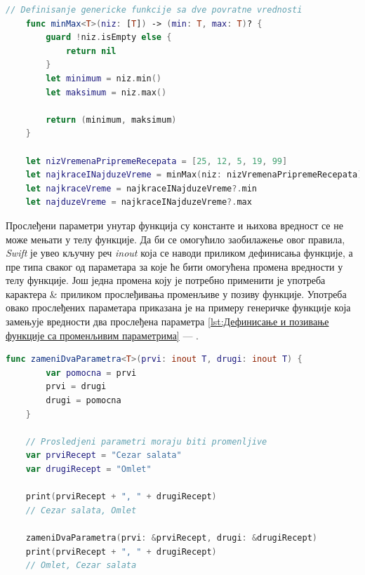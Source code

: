 \documentclass[12pt,oneside]{memoir}
\begin{document}
\begin{lstlisting}[caption=\textit{{Дефинисање и позивање генеричке функције са више повратних вредности}}, label={lst:Дефинисање и позивање генеричке  функције са више повратних вредности}, language=Swift, frame=single]
    // Definisanje genericke funkcije sa dve povratne vrednosti
    func minMax<T>(niz: [T]) -> (min: T, max: T)? {
        guard !niz.isEmpty else {
            return nil
        }
        let minimum = niz.min()
        let maksimum = niz.max()
        
        return (minimum, maksimum)
    }
    
    let nizVremenaPripremeRecepata = [25, 12, 5, 19, 99]
    let najkraceINajduzeVreme = minMax(niz: nizVremenaPripremeRecepata)
    let najkraceVreme = najkraceINajduzeVreme?.min
    let najduzeVreme = najkraceINajduzeVreme?.max
\end{lstlisting}

\indent Прослеђени параметри унутар функција су константе и њихова вредност се не може мењати у телу функције. Да би се омогућило заобилажење овог правила, \textit{Swift} је увео кључну реч \textit{inout} која се наводи приликом дефинисања функције, а пре типа сваког од параметара за које ће бити омогућена промена вредности у телу функције. Још једна промена коју је потребно применити је употреба карактера \& приликом прослеђивања променљиве у позиву функције. Употреба овако прослеђених параметара приказана је на примеру генеричке функције која замењује вредности два прослеђена параметра \ref{lst:Дефинисање и позивање функције са променљивим параметрима} --- . 

\begin{lstlisting}[caption=\textit{{Дефинисање и позивање функције са променљивим параметрима}}, label={lst:Дефинисање и позивање функције са променљивим параметрима}, language=Swift, frame=single]
    func zameniDvaParametra<T>(prvi: inout T, drugi: inout T) {
        var pomocna = prvi
        prvi = drugi
        drugi = pomocna
    }
    
    // Prosledjeni parametri moraju biti promenljive
    var prviRecept = "Cezar salata"
    var drugiRecept = "Omlet"
    
    print(prviRecept + ", " + drugiRecept)
    // Cezar salata, Omlet
    
    zameniDvaParametra(prvi: &prviRecept, drugi: &drugiRecept)
    print(prviRecept + ", " + drugiRecept)
    // Omlet, Cezar salata
    
\end{lstlisting}
\end{document}
